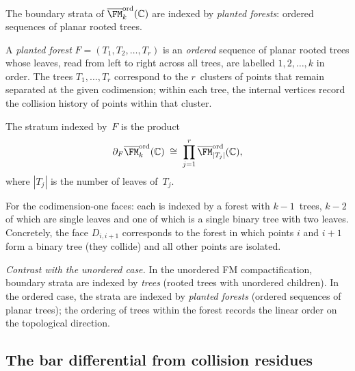 \begin{construction}
\label{constr:planted-forests}
The boundary strata of $\overline{\FM}_k^{\mathrm{ord}}(\mathbb C)$
are indexed by \emph{planted forests}: ordered sequences of
planar rooted trees.

A \emph{planted forest} $F=(T_1,T_2,\dots,T_r)$ is an
\emph{ordered} sequence of planar rooted trees whose leaves,
read from left to right across all trees, are labelled
$1,2,\dots,k$ in order. The trees $T_1,\dots,T_r$ correspond
to the $r$~clusters of points that remain separated at the
given codimension; within each tree, the internal vertices
record the collision history of points within that cluster.

The stratum indexed by~$F$ is the product
\[
\partial_F\overline{\FM}_k^{\mathrm{ord}}(\mathbb C)
\;\cong\;
\prod_{j=1}^r
\overline{\FM}_{|T_j|}^{\mathrm{ord}}(\mathbb C),
\]
where $|T_j|$ is the number of leaves of~$T_j$.

For the codimension-one faces: each is indexed by a forest
with $k{-}1$~trees, $k{-}2$ of which are single leaves and one
of which is a single binary tree with two leaves.
Concretely, the face $D_{i,i+1}$ corresponds to the forest in
which points $i$ and $i{+}1$ form a binary tree (they collide)
and all other points are isolated.

\emph{Contrast with the unordered case.}
In the unordered FM compactification, boundary strata are
indexed by \emph{trees} (rooted trees with unordered children).
In the ordered case, the strata are indexed by
\emph{planted forests} (ordered sequences of planar trees);
the ordering of trees within the forest records the linear
order on the topological direction.
\end{construction}

\subsection{The bar differential from collision residues}
\label{subsec:bar-diff-collision}

